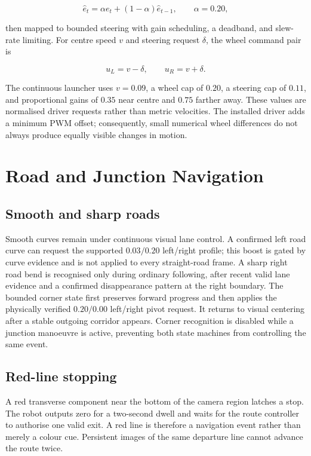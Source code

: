\documentclass[10pt,a4paper,twocolumn]{article}
\begin{document}
\begin{equation}
 \hat e_t=\alpha e_t+(1-\alpha)\hat e_{t-1}, \qquad \alpha=0.20,
\end{equation}

then mapped to bounded steering with gain scheduling, a deadband, and slew-rate
limiting. For centre speed $v$ and steering request $\delta$, the wheel command
pair is

\begin{equation}
 u_L=v-\delta, \qquad u_R=v+\delta .
\end{equation}

The continuous launcher uses $v=0.09$, a wheel cap of $0.20$, a steering cap of
$0.11$, and proportional gains of $0.35$ near centre and $0.75$ farther away.
These values are normalised driver requests rather than metric velocities. The
installed driver adds a minimum PWM offset; consequently, small numerical wheel
differences do not always produce equally visible changes in motion.

\section{Road and Junction Navigation}

\subsection{Smooth and sharp roads}

Smooth curves remain under continuous visual lane control. A confirmed left
road curve can request the supported $0.03/0.20$ left/right profile; this boost
is gated by curve evidence and is not applied to every straight-road frame. A sharp right road
bend is recognised only during ordinary following, after recent valid lane
evidence and a confirmed disappearance pattern at the right boundary. The
bounded corner state first preserves forward progress and then applies the
physically verified $0.20/0.00$ left/right pivot request. It returns to visual
centering after a stable outgoing corridor appears. Corner recognition is
disabled while a junction manoeuvre is active, preventing both state machines
from controlling the same event.

\subsection{Red-line stopping}

A red transverse component near the bottom of the camera region latches a stop.
The robot outputs zero for a two-second dwell and waits for the route controller
to authorise one valid exit. A red line is therefore a navigation event rather
than merely a colour cue. Persistent images of the same departure line cannot
advance the route twice.
\end{document}
